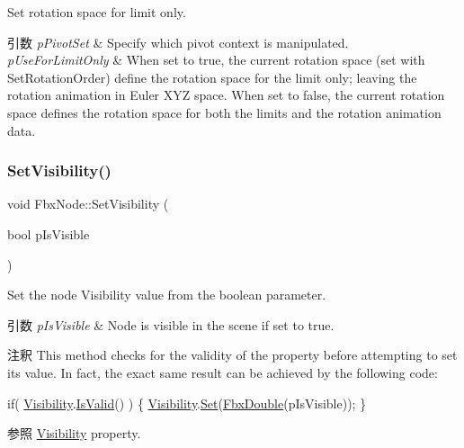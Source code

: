 Set rotation space for limit only. 
\begin{DoxyParams}{引数}
{\em p\+Pivot\+Set} & Specify which pivot context is manipulated. \\
\hline
{\em p\+Use\+For\+Limit\+Only} & When set to {\ttfamily true}, the current rotation space (set with Set\+Rotation\+Order) define the rotation space for the limit only; leaving the rotation animation in Euler X\+YZ space. When set to {\ttfamily false}, the current rotation space defines the rotation space for both the limits and the rotation animation data. \\
\hline
\end{DoxyParams}
\mbox{\label{class_fbx_node_a9550907cb5b273af36951e207a4666e7}} 
\subsubsection{\texorpdfstring{Set\+Visibility()}{SetVisibility()}}
{\footnotesize\ttfamily void Fbx\+Node\+::\+Set\+Visibility (\begin{DoxyParamCaption}\item[{bool}]{p\+Is\+Visible }\end{DoxyParamCaption})}

Set the node Visibility value from the boolean parameter. 
\begin{DoxyParams}{引数}
{\em p\+Is\+Visible} & Node is visible in the scene if set to {\ttfamily true}. \\
\hline
\end{DoxyParams}
\begin{DoxyRemark}{注釈}
This method checks for the validity of the property before attempting to set its value. In fact, the exact same result can be achieved by the following code\+: 
\begin{DoxyCode}
\textcolor{keywordflow}{if}( \hyperlink{class_fbx_node_a9f02f0a70b81c1a656137def3e34edb7}{Visibility}.\hyperlink{class_fbx_property_a1c40042c55d1f4a1d4837f06fbc1d764}{IsValid}() )
\{
    \hyperlink{class_fbx_node_a9f02f0a70b81c1a656137def3e34edb7}{Visibility}.\hyperlink{class_fbx_property_t_a7245e9041d26955a5c2f31fc40b63228}{Set}(\hyperlink{fbxtypes_8h_a171e72a1c46fc15c1a6c9c31948c1c5b}{FbxDouble}(pIsVisible));
\}
\end{DoxyCode}

\end{DoxyRemark}
\begin{DoxySeeAlso}{参照}
\hyperlink{class_fbx_node_a9f02f0a70b81c1a656137def3e34edb7}{Visibility} property. 
\end{DoxySeeAlso}
\mbox{\label{class_fbx_node_a688e3423bbb7c0d5cae92e9d92dcd9a5}} 
